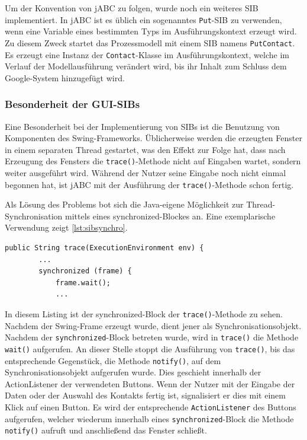 Um der Konvention von jABC zu folgen, wurde noch ein weiteres SIB implementiert.
In jABC ist es üblich ein sogenanntes \lstinline{Put}-SIB zu verwenden, wenn eine Variable eines bestimmten Typs im
 Ausführungskontext erzeugt wird.
Zu diesem Zweck startet das Prozessmodell mit einem SIB namens \lstinline{PutContact}.
Es erzeugt eine Instanz der \lstinline{Contact}-Klasse im Ausführungskontext, welche im Verlauf der Modellausführung
 verändert wird, bis ihr Inhalt zum Schluss dem Google-System hinzugefügt wird.
	
\FloatBarrier
\subsubsection{Besonderheit der GUI-SIBs}
Eine Besonderheit bei der Implementierung von SIBs ist die Benutzung von Komponenten des Swing-Frameworks.
Üblicherweise werden die erzeugten Fenster in einem separaten Thread gestartet, was den Effekt zur Folge hat, dass nach
 Erzeugung des Fensters die \lstinline{trace()}-Methode nicht auf Eingaben wartet, sondern weiter ausgeführt wird.
Während der Nutzer seine Eingabe noch nicht einmal begonnen hat, ist jABC mit der Ausführung der \lstinline{trace()}-Methode
 schon fertig.

Als Lösung des Problems bot sich die Java-eigene Möglichkeit zur Thread-Synchronisation mittels eines synchronized-Blockes an.
Eine exemplarische Verwendung zeigt \autoref{lst:sibsynchro}.

\begin{lstlisting}[float=h!t]
	public String trace(ExecutionEnvironment env) {
		...
		synchronized (frame) {
			frame.wait();
			...
\end{lstlisting}

In diesem Listing ist der synchronized-Block der \lstinline{trace()}-Methode zu sehen.
Nachdem der Swing-Frame erzeugt wurde, dient jener als Synchronisationsobjekt.
Nachdem der \lstinline{synchronized}-Block betreten wurde, wird in \lstinline{trace()} die Methode \lstinline{wait()} aufgerufen.
An dieser Stelle stoppt die Ausführung von \lstinline{trace()}, bis das entsprechende Gegenstück, die Methode \lstinline{notify()},
 auf dem Synchronisationsobjekt aufgerufen wurde.
Dies geschieht innerhalb der ActionListener der verwendeten Buttons.
Wenn der Nutzer mit der Eingabe der Daten oder der Auswahl des Kontakts fertig ist, signalisiert er dies mit einem
 Klick auf einen Button.
Es wird der entsprechende \lstinline{ActionListener} des Buttons aufgerufen, welcher wiederum innerhalb eines
 \lstinline{synchronized}-Block die Methode \lstinline{notify()} aufruft und anschließend das Fenster schließt.


